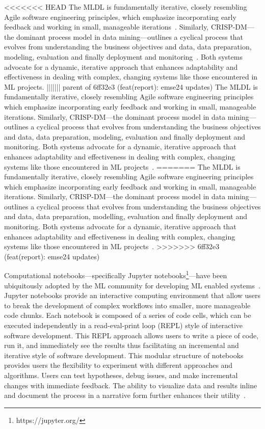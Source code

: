 <<<<<<< HEAD
The MLDL is fundamentally iterative, closely resembling Agile software engineering principles, which emphasize incorporating early feedback and working in small, manageable iterations~\cite{betz2018managing}. Similarly, CRISP-DM---the dominant process model in data mining---outlines a cyclical process that evolves from understanding the business objectives and data, data preparation, modeling, evaluation and finally deployment and monitoring~\cite{martinez-plumed2021crisp-dm}. Both systems advocate for a dynamic, iterative approach that enhances adaptability and effectiveness in dealing with complex, changing systems like those encountered in ML projects.
||||||| parent of 6ff32e3 (feat(report): emse24 updates)
The MLDL is fundamentally iterative, closely resembling Agile software engineering principles which emphasize incorporating early feedback and working in small, manageable iterations. Similarly, CRISP-DM---the dominant process model in data mining---outlines a cyclical process that evolves from understanding the business objectives and data, data preparation, modeling, evaluation and finally deployment and monitoring. Both systems advocate for a dynamic, iterative approach that enhances adaptability and effectiveness in dealing with complex, changing systems like those encountered in ML projects~\cite{betz2018managing,martinez-plumed2021crisp-dm}.
=======
The MLDL is fundamentally iterative, closely resembling Agile software engineering principles which emphasize incorporating early feedback and working in small, manageable iterations. Similarly, CRISP-DM---the dominant process model in data mining---outlines a cyclical process that evolves from understanding the business objectives and data, data preparation, modelling, evaluation and finally deployment and monitoring. Both systems advocate for a dynamic, iterative approach that enhances adaptability and effectiveness in dealing with complex, changing systems like those encountered in ML projects~\cite{betz2018managing,martinez-plumed2021crisp-dm}.
>>>>>>> 6ff32e3 (feat(report): emse24 updates)

Computational notebooks---specifically Jupyter notebooks\footnote{https://jupyter.org/}---have been ubiquitously adopted by the ML community for developing ML enabled systems~\cite{pimentel2019large-scale,quaranta2021kgtorrent,psallidas2019data,perkel2018why}. Jupyter notebooks provide an interactive computing environment that allow users to break the development of complex workflows into smaller, more manageable code chunks. Each notebook is composed of a series of code cells, which can be executed independently in a read-eval-print loop (REPL) style of interactive software development. This REPL approach allows users to write a piece of code, run it, and immediately see the results thus facilitating an incremental and iterative style of software development. This modular structure of notebooks provides users the flexibility to experiment with different approaches and algorithms. Users can test hypotheses, debug issues, and make incremental changes with immediate feedback. The ability to visualize data and results inline and document the process in a narrative form further enhances their utility~\cite{kery2018story,head2019managing,rule2018exploration,chattopadhyay2020whats}.

